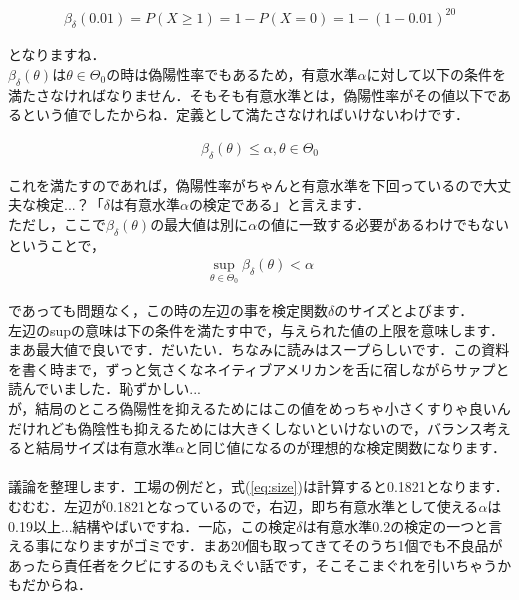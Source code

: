 \documentclass[11pt,a4paper]{ujreport} 	%
\begin{document}
\begin{align}
  \beta_\delta(0.01) = P(X \geq 1) = 1-P(X=0) = 1-(1-0.01)^{20}
  \label{eq:size}
\end{align}

となりますね．\\

$\beta_\delta(\theta)$は$\theta \in \Theta_0$の時は偽陽性率でもあるため，有意水準$\alpha$に対して以下の条件を満たさなければなりません．そもそも有意水準とは，偽陽性率がその値以下であるという値でしたからね．定義として満たさなければいけないわけです．

\begin{align}
  \beta_\delta(\theta) \leq \alpha, \theta \in \Theta_0
  \label{eq:power}
\end{align}

これを満たすのであれば，偽陽性率がちゃんと有意水準を下回っているので大丈夫な検定...？「$\delta$は有意水準$\alpha$の検定である」と言えます．\\

ただし，ここで$\beta_\delta(\theta)$の最大値は別に$\alpha$の値に一致する必要があるわけでもないということで，
\begin{align}
\displaystyle \sup_{\theta \in\Theta_0} \beta_\delta(\theta) < \alpha
\end{align}

であっても問題なく，この時の左辺の事を検定関数$\delta$のサイズとよびます．\\

左辺のsupの意味は下の条件を満たす中で，与えられた値の上限を意味します．まあ最大値で良いです．だいたい．ちなみに読みはスープらしいです．この資料を書く時まで，ずっと気さくなネイティブアメリカンを舌に宿しながらサァプと読んでいました．恥ずかしい...\\

が，結局のところ偽陽性を抑えるためにはこの値をめっちゃ小さくすりゃ良いんだけれども偽陰性も抑えるためには大きくしないといけないので，バランス考えると結局サイズは有意水準$\alpha$と同じ値になるのが理想的な検定関数になります．\\
\\

議論を整理します．工場の例だと，式(\ref{eq:size})は計算すると0.1821となります．むむむ．左辺が0.1821となっているので，右辺，即ち有意水準として使える$\alpha$は0.19以上...結構やばいですね．一応，この検定$\delta$は有意水準0.2の検定の一つと言える事になりますがゴミです．まあ20個も取ってきてそのうち1個でも不良品があったら責任者をクビにするのもえぐい話です，そこそこまぐれを引いちゃうかもだからね．\\
\end{document}
